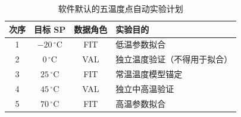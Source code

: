 \begin{table}[H]\centering
\caption{软件默认的五温度点自动实验计划}
\begin{tabular}{@{}cccp{55mm}@{}}\toprule
次序 & 目标 SP & 数据角色 & 实验目的\\\midrule
1 & $-20\, ^\circ\mathrm C$ & FIT & 低温参数拟合\\
2 & $0\, ^\circ\mathrm C$ & VAL & 独立温度验证（不得用于拟合）\\
3 & $25\, ^\circ\mathrm C$ & FIT & 常温温度模型锚定\\
4 & $45\, ^\circ\mathrm C$ & VAL & 独立中高温验证\\
5 & $70\, ^\circ\mathrm C$ & FIT & 高温参数拟合\\\bottomrule\end{tabular}\end{table}
